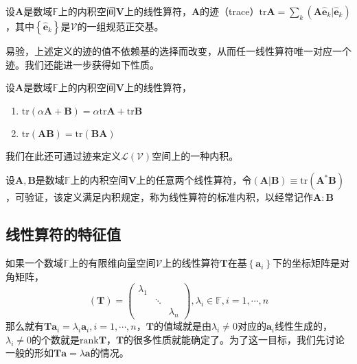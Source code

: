 \documentclass[main.tex]{subfiles}
\begin{document}
\begin{definition}[线性算符的迹]
设$\mathbf{A}$是数域$\mathbb{F}$上的内积空间$\mathbf{V}$上的线性算符，$\mathbf{A}$的迹（trace）$\mathrm{tr}\mathbf{A}=\sum_k\left(\mathbf{A}\mathbf{\hat{e}}_k|\mathbf{\hat{e}}_k\right)$，其中$\left\{\mathbf{\hat{e}}_k\right\}$是$\mathcal{V}$的一组规范正交基。
\end{definition}

易验，上述定义的迹的值不依赖基的选择而改变，从而任一线性算符唯一对应一个迹。我们还能进一步获得如下性质。

\begin{theorem}
设$\mathbf{A}$是数域$\mathbb{F}$上的内积空间$\mathbf{V}$上的线性算符，
\begin{enumerate}
    \item $\mathrm{tr}\left(\alpha\mathbf{A}+\mathbf{B}\right)=\alpha\mathrm{tr}\mathbf{A}+\mathrm{tr}\mathbf{B}$
    \item $\mathrm{tr}\left(\mathbf{AB}\right)=\mathrm{tr}\left(\mathbf{BA}\right)$
\end{enumerate}
\end{theorem}

我们在此还可通过迹来定义$\mathcal{L}\left(\mathcal{V}\right)$空间上的一种内积。

\begin{definition}[线性算符的标准内积]
设$\mathbf{A},\mathbf{B}$是数域$\mathbb{F}$上的内积空间$\mathbf{V}$上的任意两个线性算符，令$\left(\mathbf{A}|\mathbf{B}\right)\equiv\mathrm{tr}\left(\mathbf{A}^*\mathbf{B}\right)$，可验证，该定义满足内积规定，称为线性算符的标准内积，以经常记作$\mathbf{A}:\mathbf{B}$
\end{definition}

\subsection{线性算符的特征值}
如果一个数域$\mathbb{F}$上的有限维向量空间$\mathcal{V}$上的线性算符$\mathbf{T}$在基$\left\{\mathbf{a}_i\right\}$下的坐标矩阵是对角矩阵，
\[\left(\mathbf{T}\right)=\left(\begin{array}{ccc}\lambda_1&&\\&\ddots&\\&&\lambda_n\end{array}\right),\lambda_i\in\mathbb{F},i=1,\cdots,n\]
那么就有$\mathbf{Ta}_i=\lambda_i \mathbf{a}_i,i=1,\cdots,n$，$\mathbf{T}$的值域就是由$\lambda_i\neq 0$对应的$\mathbf{a}_i$线性生成的，$\lambda_i\neq 0$的个数就是$\mathrm{rank}\mathbf{T}$，$\mathbf{T}$的很多性质就能确定了。为了这一目标，我们先讨论一般的形如$\mathbf{Ta}=\lambda\mathbf{a}$的情况。
\end{document}
